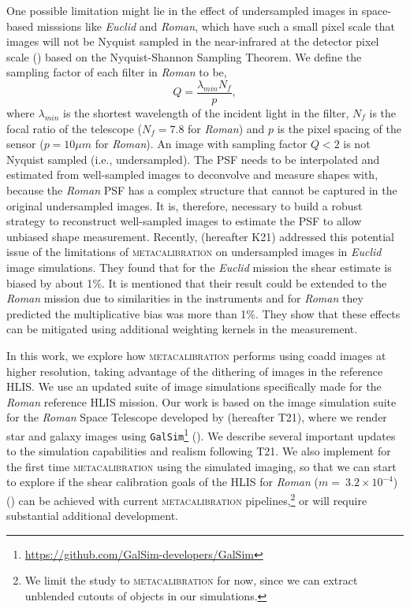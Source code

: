 \documentclass[fleqn,usenatbib]{mnras}
\begin{document}
One possible limitation might lie in the effect of undersampled images in space-based misssions like \emph{Euclid} and \emph{Roman}, which have such a small pixel scale that images will not be Nyquist sampled in the near-infrared at the detector pixel scale (\citealt{2013PASP..125.1496S}) based on the Nyquist-Shannon Sampling Theorem. We define the sampling factor of each filter in \emph{Roman} to be, 
\begin{equation}
    Q = \frac{\lambda_{min}N_{f}}{p}, 
    \label{eqn:sampling}
\end{equation}
where $\lambda_{min}$ is the shortest wavelength of the incident light in the filter, $N_{f}$ is the focal ratio of the telescope ($N_{f}=7.8$ for \emph{Roman}) and $p$ is the pixel spacing of the sensor ($p=10\mu m$ for \emph{Roman}). An image with sampling factor $Q < 2$ is not Nyquist sampled (i.e., undersampled). The PSF needs to be interpolated and estimated from well-sampled images to deconvolve and measure shapes with, because the \emph{Roman} PSF has a complex structure that cannot be captured in the original undersampled images. It is, therefore, necessary to build a robust strategy to reconstruct well-sampled images to estimate the PSF to allow unbiased shape measurement.
Recently, \cite{2021MNRAS.502.4048K} (hereafter K21) addressed this potential issue of the limitations of \textsc{metacalibration} on undersampled images in \emph{Euclid} image simulations. They found that for the \emph{Euclid} mission the shear estimate is biased by about 1$\%$. It is mentioned that their result could be extended to the \emph{Roman} mission due to similarities in the instruments and for \emph{Roman} they predicted the multiplicative bias was more than 1\%. They show that these effects can be mitigated using additional weighting kernels in the measurement. 

In this work, we explore how \textsc{metacalibration} performs using coadd images at higher resolution, taking advantage of the dithering of images in the reference HLIS. We use an updated suite of image simulations specifically made for the \emph{Roman} reference HLIS mission. Our work is based on the image simulation suite for the \emph{Roman} Space Telescope developed by \cite{2021MNRAS.501.2044T} (hereafter T21), where we render star and galaxy images using \texttt{GalSim}\footnote{\url{ https://github.com/GalSim-developers/GalSim}} (\citealt{2015A&C....10..121R}). We describe several important updates to the simulation capabilities and realism following T21. We also implement for the first time \textsc{metacalibration} using the simulated imaging, so that we can start to explore if the shear calibration goals of the HLIS for \emph{Roman} ($m=~3.2\times10^{-4}$) (\citealt{2018arXiv180403628D}) can be achieved with current \textsc{metacalibration} pipelines,\footnote{We limit the study to \textsc{metacalibration} for now, since we can extract unblended cutouts of objects in our simulations.} or will require substantial additional development. \par
\end{document}
